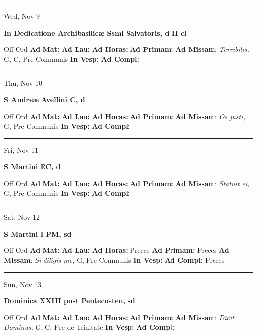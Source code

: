 \documentclass[letterpaper, 10pt]{article}
\begin{document}
\hrule
\begin{center}
Wed, Nov 9
\end{center}\textbf{ \large In Dedicatione Archibasilicæ Ssmi Salvatoris, \textnormal{\normalsize d II cl}}
\begin{justify}
Off Ord
\textbf{Ad Mat: }
\textbf{Ad Lau: }
\textbf{Ad Horas: }
\textbf{Ad Primam: }
\textbf{Ad Missam}: \textit{Terribilis,} G, C, Pre Communis
\textbf{In Vesp: }
\textbf{Ad Compl: }\end{justify}



\hrule
\begin{center}
Thu, Nov 10
\end{center}\textbf{ \large S Andreæ Avellini C, \textnormal{\normalsize d}}
\begin{justify}
Off Ord
\textbf{Ad Mat: }
\textbf{Ad Lau: }
\textbf{Ad Horas: }
\textbf{Ad Primam: }
\textbf{Ad Missam}: \textit{Os justi,} G, Pre Communis
\textbf{In Vesp: }
\textbf{Ad Compl: }\end{justify}



\hrule
\begin{center}
Fri, Nov 11
\end{center}\textbf{ \large S Martini  EC, \textnormal{\normalsize d}}
\begin{justify}
Off Ord
\textbf{Ad Mat: }
\textbf{Ad Lau: }
\textbf{Ad Horas: }
\textbf{Ad Primam: }
\textbf{Ad Missam}: \textit{Statuit ei,} G, Pre Communis
\textbf{In Vesp: }
\textbf{Ad Compl: }\end{justify}



\hrule
\begin{center}
Sat, Nov 12
\end{center}\textbf{ \large S Martini I PM, \textnormal{\normalsize sd}}
\begin{justify}
Off Ord
\textbf{Ad Mat: }
\textbf{Ad Lau: }
\textbf{Ad Horas: }Preces
\textbf{Ad Primam: }Preces
\textbf{Ad Missam}: \textit{Si diligis me,} G, Pre Communis
\textbf{In Vesp: }
\textbf{Ad Compl: }Preces\end{justify}



\hrule
\begin{center}
Sun, Nov 13
\end{center}\textbf{ \large Dominica XXIII post Pentecosten, \textnormal{\normalsize sd}}
\begin{justify}
Off Ord
\textbf{Ad Mat: }
\textbf{Ad Lau: }
\textbf{Ad Horas: }
\textbf{Ad Primam: }
\textbf{Ad Missam}: \textit{Dicit Dominus,} G, C, Pre de Trinitate
\textbf{In Vesp: }
\textbf{Ad Compl: }\end{justify}
\end{document}
